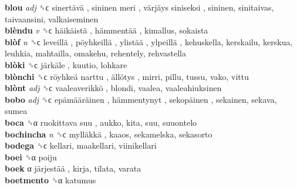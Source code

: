 \textbf{blou} \emph{adj}  ␝ϲ   sinertävä ,  sininen meri ,  värjäys siniseksi , sininen, sinitaivas, taivaansini, valkaiseminen  \\
\textbf{blèndu} \emph{v}  ␝ϲ   häikäistä ,  hämmentää , kimallus, sokaista  \\
\textbf{blòf} \emph{n}  ␝ϲ   leveillä ,  pöyhkeillä ,  ylistää ,  ylpeillä , kehuskella, kerskailu, kerskua, leuhkia, mahtailla, omakehu, rehentely, rehvastella  \\
\textbf{blòki} ␝ϲ   järkäle , kuutio, lohkare  \\
\textbf{blònchi} ␝ϲ   röyhkeä narttu ,  ällötys , mirri, pillu, tussu, vako, vittu  \\
\textbf{blònt} \emph{adj}  ␝ϲ   vaaleaverikkö , blondi, vaalea, vaaleahiuksinen  \\
\textbf{bobo} \emph{adj}  ␝ϲ   epämääräinen ,  hämmentynyt ,  sekopäinen , sekainen, sekava, sumea  \\
\textbf{boca} ␝α   ruokittava suu , aukko, kita, suu, suuontelo  \\
\textbf{bochincha} \emph{n}  ␝ϲ   mylläkkä , kaaos, sekamelska, sekasorto  \\
\textbf{bodega} ␝ϲ  kellari, maakellari, viinikellari  \\
\textbf{boei} ␝α  poiju  \\
\textbf{boek} α   järjestää , kirja, tilata, varata  \\
\textbf{boetmento} ␝α  katumus  \\
